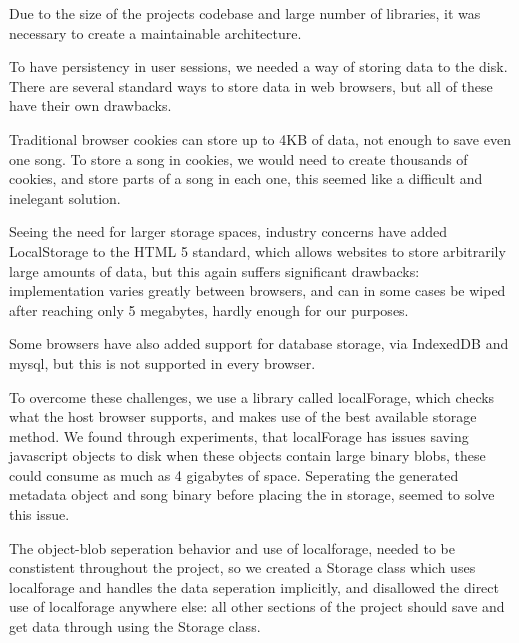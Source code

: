 Due to the size of the projects codebase and large number of libraries, it was necessary to create a maintainable architecture.



To have persistency in user sessions, we needed a way of storing data to the disk. There are several standard ways to store data in web browsers, but all of these have their own drawbacks.

Traditional browser cookies can store up to 4KB of data, 
not enough to save even one song. 
To store a song in cookies, 
we would need to create thousands of cookies, 
and store parts of a song in each one, 
this seemed like a difficult and inelegant solution.

Seeing the need for larger storage spaces, 
industry concerns have added LocalStorage to the HTML 5 standard,
which allows websites to store arbitrarily large amounts of data,
but this again suffers significant drawbacks: 
implementation varies greatly between browsers, 
and can in some cases be wiped after reaching only 5 megabytes, 
hardly enough for our purposes.

Some browsers have also added support for database storage, via IndexedDB and mysql, but this is not supported in every browser.

To overcome these challenges, we use a library called localForage, 
which checks what the host browser supports,
and makes use of the best available storage method.
We found through experiments,
that localForage has issues saving javascript objects to disk when these objects contain large binary blobs, 
these could consume as much as 4 gigabytes of space.
Seperating the generated metadata object and song binary before placing the in storage, 
seemed to solve this issue.

The object-blob seperation behavior and use of localforage,
needed to be constistent throughout the project, 
so we created a Storage class which uses localforage and handles the data seperation implicitly, 
and disallowed the direct use of localforage anywhere else: all other sections of the project should save and get data through using the Storage class.


